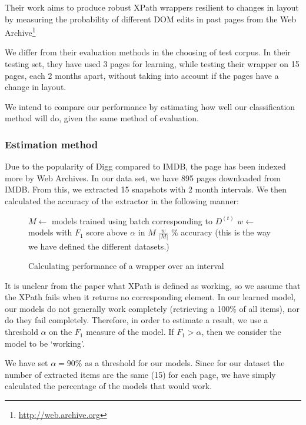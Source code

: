 Their work aims to produce robust XPath wrappers resilient to changes 
in layout by measuring the probability of different DOM edits in past pages
from the Web Archive\footnote{\url{http://web.archive.org}}

We differ from their evaluation methods in the choosing of test corpus. In their testing
set, they have used 3 pages for learning, while testing their wrapper on 15 pages,
each 2 months apart, without taking into account if the pages have a change in layout.

	We intend to compare our performance by estimating how well our classification method will do, given the same
method of evaluation.
\subsubsection{Estimation method}
Due to the popularity of Digg compared to IMDB, the page has been indexed more by Web Archives.
In our data set, we have 895 pages downloaded from IMDB. From this, we extracted 15 snapshots
with 2 month intervals. We then calculated the accuracy of the extractor in the following manner:

\begin{figure}[htbp]
\singlespacing
	\begin{algorithm}[H]
	\caption{Calculating performance of a wrapper over an interval}
	\begin{algorithmic}[1]
			\STATE $M \leftarrow$ models trained using batch corresponding to $D^{(t)}$
			\STATE $w \leftarrow$ models with $F_1$ score above $\alpha$ in $M$
			\RETURN $\frac{w}{|M|}$
		\ELSE
			\% accuracy (this is the way we have defined the different datasets.)
		\ENDIF
	\end{algorithmic}
	\end{algorithm}
\label{fig:evalmeth}
\end{figure}
It is unclear from the paper what XPath is defined as working, so we assume that
the XPath fails when it returns no corresponding element. In our learned model,
our models do not generally work completely (retrieving a 100\% of all items),
nor do they fail completely. Therefore, in order to estimate a result, we use 
a threshold $\alpha$ on the $F_1$ measure of the model. If $F_1 > \alpha$,
then we consider the model to be `working'.


We have set $\alpha = 90\%$ as a threshold for our models. 
Since for our dataset the number of extracted items are the same (15) for each page,
we have simply calculated the percentage of the models that would work.

